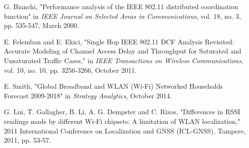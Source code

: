  G. Bianchi, "Performance analysis of the IEEE 802.11 distributed coordination function" in {\it IEEE Journal on Selected Areas in Communications}, vol. 18, no. 3, pp. 535-547, March 2000.

 E. Felemban and E. Ekici, "Single Hop IEEE 802.11 DCF Analysis Revisited: Accurate Modeling of Channel Access Delay and Throughput for Saturated and Unsaturated Traffic Cases," in {\it IEEE Transactions on Wireless Communications}, vol. 10, no. 10, pp. 3256-3266, October 2011.

 E. Smith, "Global Broadband and WLAN (Wi-Fi) Networked Households Forecast 2009-2018" in {\it Strategy Analytics}, October 2014.

 G. Lui, T. Gallagher, B. Li, A. G. Dempster and C. Rizos, "Differences in RSSI readings made by different Wi-Fi chipsets: A limitation of WLAN localization," 2011 International Conference on Localization and GNSS (ICL-GNSS), Tampere, 2011, pp. 53-57.
